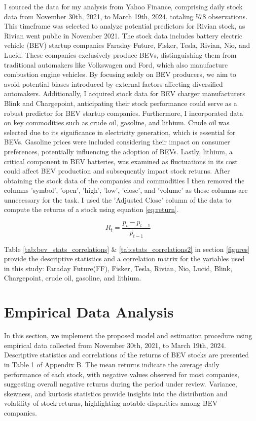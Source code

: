 \documentclass[a4paper,12pt]{article}
\begin{document}
I sourced the data for my analysis from Yahoo Finance, comprising daily stock data from November 30th, 2021, to March 19th, 2024, totaling 578 observations. This timeframe was selected to analyze potential predictors for Rivian stock, as Rivian went public in November 2021. The stock data includes battery electric vehicle (BEV) startup companies Faraday Future, Fisker, Tesla, Rivian, Nio, and Lucid. These companies exclusively produce BEVs, distinguishing them from traditional automakers like Volkswagen and Ford, which also manufacture combustion engine vehicles. By focusing solely on BEV producers, we aim to avoid potential biases introduced by external factors affecting diversified automakers. Additionally, I acquired stock data for BEV charger manufacturers Blink and Chargepoint, anticipating their stock performance could serve as a robust predictor for BEV startup companies. Furthermore, I incorporated data on key commodities such as crude oil, gasoline, and lithium. Crude oil was selected due to its significance in electricity generation, which is essential for BEVs. Gasoline prices were included considering their impact on consumer preferences, potentially influencing the adoption of BEVs. Lastly, lithium, a critical component in BEV batteries, was examined as fluctuations in its cost could affect BEV production and subsequently impact stock returns. After obtaining the stock data of the companies and commodities I then removed the columns 'symbol', 'open', 'high', 'low', 'close', and 'volume' as these columns are unnecessary for the task. I used the 'Adjusted Close' column of the data to compute the returns of a stock using equation \ref{eq:return}. 

\begin{equation} \label{eq:return}
R_t = \frac{p_t - p_{t-1}}{p_{t-1}}
\end{equation}


Table \ref{tab:bev_stats_correlations} \& \ref{tab:stats_correlations2} in section \ref{figures} provide the descriptive statistics and a correlation matrix for the variables used in this study: Faraday Future(FF), Fisker, Tesla, Rivian, Nio, Lucid, Blink, Chargepoint, crude oil, gasoline, and lithium. 


\section{Empirical Data Analysis}

In this section, we implement the proposed model and estimation procedure using empirical data collected from November 30th, 2021, to March 19th, 2024. Descriptive statistics and correlations of the returns of BEV stocks are presented in Table 1 of Appendix B. The mean returns indicate the average daily performance of each stock, with negative values observed for most companies, suggesting overall negative returns during the period under review. Variance, skewness, and kurtosis statistics provide insights into the distribution and volatility of stock returns, highlighting notable disparities among BEV companies.
\end{document}
